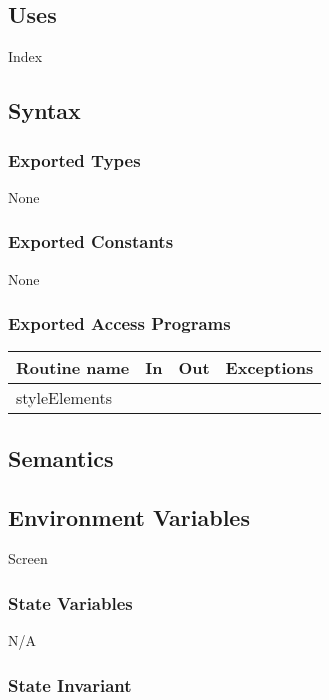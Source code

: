 \documentclass[12pt]{article}
\begin{document}
\subsection* {Uses}

Index

\subsection* {Syntax}

\subsubsection* {Exported Types}

None

\subsubsection* {Exported Constants}

None

\subsubsection* {Exported Access Programs}

\begin{tabular}{| l | l | l | p{6cm} |}
\hline
\textbf{Routine name} & \textbf{In} & \textbf{Out} & \textbf{Exceptions}\\
\hline
styleElements & ~ & ~ &  \\
\hline
\end{tabular}

\subsection* {Semantics}

\subsection*{Environment Variables}

Screen

\subsubsection* {State Variables}
N/A

\subsubsection* {State Invariant}
\end{document}
